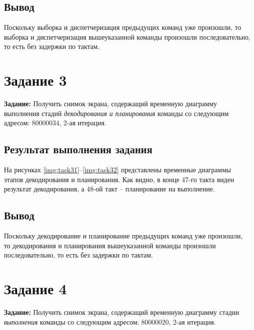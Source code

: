 
\clearpage


\subsection{Вывод}

Поскольку выборка и диспетчеризация предыдущих команд уже произошли, то выборка и диспетчеризация вышеуказанной команды произошли последовательно, то есть без задержки по тактам.


\section{Задание 3}

\textbf{Задание:} Получить снимок экрана, содержащий временную диаграмму выполнения стадий \textit{декодирования и планирования} команды со следующим адресом: 80000034, 2-ая итерация.

\subsection{Результат выполнения задания}

На рисунках \ref{img:task31}--\ref{img:task32} представлены временные диаграммы этапов декодирования и планирования. Как видно, в конце 47-го такта виден результат декодирования, а 48-ой такт -- планирование на выполнение.



\clearpage


\subsection{Вывод}

Поскольку декодирование и планирование предыдущих команд уже произошли, то декодирования и планирования вышеуказанной команды произошли последовательно, то есть без задержки по тактам.


\section{Задание 4}

\textbf{Задание:} Получить снимок экрана, содержащий временную диаграмму стадии \textit{выполнения} команды со следующим адресом: 80000020, 2-ая итерация.

